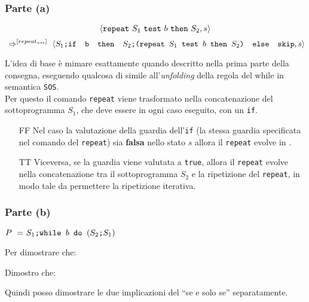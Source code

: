 {
	\subsubsection{Parte (a)}
	\begin{center}
	\[ \langle{}\texttt{repeat}~S_1~\texttt{test}~b~\texttt{then}~S_2, s\rangle{} \]
	\[~\Rightarrow^{[repeat_{sos}]}~
	\langle{}\textrm{\normalfont{\texttt{$S_1$;\mbox{\normalfont{\texttt{if }}} b \textrm{\normalfont{\texttt{ then }}} \textrm{\normalfont{\texttt{$S_2$;(\texttt{repeat}~$S_1$~\texttt{test}~$b$~\texttt{then}~$S_2$)}}} \textrm{\normalfont{\texttt{ else }}} \textrm{\normalfont{\texttt{skip}}}}}}, s\rangle{} \]

	\end{center}
	L'idea di base è mimare esattamente quando descritto nella prima parte
	della consegna, eseguendo qualcosa di simile all'\emph{unfolding} della
	regola del while in semantica \texttt{SOS}. \\
	Per questo il comando
	\texttt{repeat} viene trasformato nella concatenazione del sottoprogramma
	$S_1$, che deve essere in ogni caso eseguito, con un \texttt{if}. 
	\begin{itemize}
		\item [FF] Nel caso
		la valutazione della guardia dell'\texttt{if} (la stessa guardia
		specificata nel comando del \texttt{repeat}) sia \textbf{falsa} nello stato $s$
		allora il \texttt{repeat} evolve in \skipistr{}.
		\item [TT] Viceversa, se la guardia
		viene valutata a \texttt{true}, allora il \texttt{repeat} evolve nella
		concatenazione tra il sottoprogramma $S_2$ e la ripetizione del 
		\texttt{repeat}, in modo tale da permettere la ripetizione iterativa.\\
	\end{itemize}
	

	\subsubsection{Parte (b)}
	\begin{center}
	$P~=~\PDef{}$
	\end{center}
	Per dimostrare che:
	\begin{center}
	\exThreeB{}
	\end{center}
	Dimostro che:
	\begin{center}
	\exThreeIff{}
	\end{center}
	Quindi posso dimostrare le due implicazioni del ``se e solo se''
	separatamente.


}
